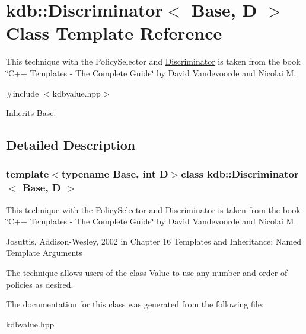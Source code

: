 \hypertarget{classkdb_1_1Discriminator}{\section{kdb\-:\-:Discriminator$<$ Base, D $>$ Class Template Reference}
\label{classkdb_1_1Discriminator}
}


This technique with the Policy\-Selector and \hyperlink{classkdb_1_1Discriminator}{Discriminator} is taken from the book \char`\"{}\-C++ Templates -\/ The Complete Guide\char`\"{} by David Vandevoorde and Nicolai M.  




{\ttfamily \#include $<$kdbvalue.\-hpp$>$}



Inherits Base.



\subsection{Detailed Description}
\subsubsection*{template$<$typename Base, int D$>$class kdb\-::\-Discriminator$<$ Base, D $>$}

This technique with the Policy\-Selector and \hyperlink{classkdb_1_1Discriminator}{Discriminator} is taken from the book \char`\"{}\-C++ Templates -\/ The Complete Guide\char`\"{} by David Vandevoorde and Nicolai M. 

Josuttis, Addison-\/\-Wesley, 2002 in Chapter 16 Templates and Inheritance\-: Named Template Arguments

The technique allows users of the class Value to use any number and order of policies as desired. 

The documentation for this class was generated from the following file\-:\begin{DoxyCompactItemize}
\item 
kdbvalue.\-hpp\end{DoxyCompactItemize}
